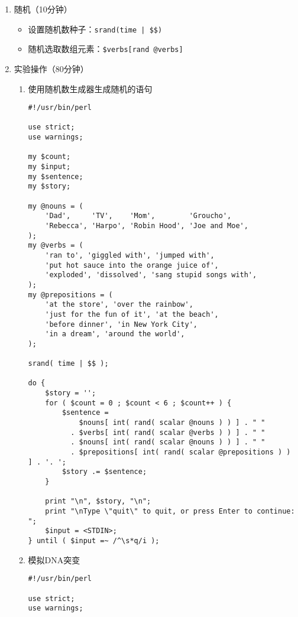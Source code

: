 \documentclass{TIJMUjiaoanSY}
\begin{document}
\firstTail

\newpage
\otherHeader

\begin{enumerate}
  \item 随机（10分钟）
    \begin{itemize}
      \item 设置随机数种子：\verb=srand(time | $$)=
      \item 随机选取数组元素：\verb|$verbs[rand @verbs]|
    \end{itemize}
  \item 实验操作（80分钟）
    \begin{enumerate}
      \item 使用随机数生成器生成随机的语句
\begin{verbatim}
#!/usr/bin/perl

use strict;
use warnings;

my $count;
my $input;
my $sentence;
my $story;

my @nouns = (
    'Dad',     'TV',    'Mom',        'Groucho',
    'Rebecca', 'Harpo', 'Robin Hood', 'Joe and Moe',
);
my @verbs = (
    'ran to', 'giggled with', 'jumped with',
    'put hot sauce into the orange juice of',
    'exploded', 'dissolved', 'sang stupid songs with',
);
my @prepositions = (
    'at the store', 'over the rainbow',
    'just for the fun of it', 'at the beach',
    'before dinner', 'in New York City',
    'in a dream', 'around the world',
);

srand( time | $$ );

do {
    $story = '';
    for ( $count = 0 ; $count < 6 ; $count++ ) {
        $sentence =
            $nouns[ int( rand( scalar @nouns ) ) ] . " "
          . $verbs[ int( rand( scalar @verbs ) ) ] . " "
          . $nouns[ int( rand( scalar @nouns ) ) ] . " "
          . $prepositions[ int( rand( scalar @prepositions ) ) ] . '. ';
        $story .= $sentence;
    }

    print "\n", $story, "\n";
    print "\nType \"quit\" to quit, or press Enter to continue: ";
    $input = <STDIN>;
} until ( $input =~ /^\s*q/i );

\end{verbatim}

\otherTail
\newpage
\otherHeader

      \item 模拟DNA突变
\begin{verbatim}
#!/usr/bin/perl

use strict;
use warnings;


\end{verbatim}
\end{enumerate}
\end{enumerate}
\end{document}
